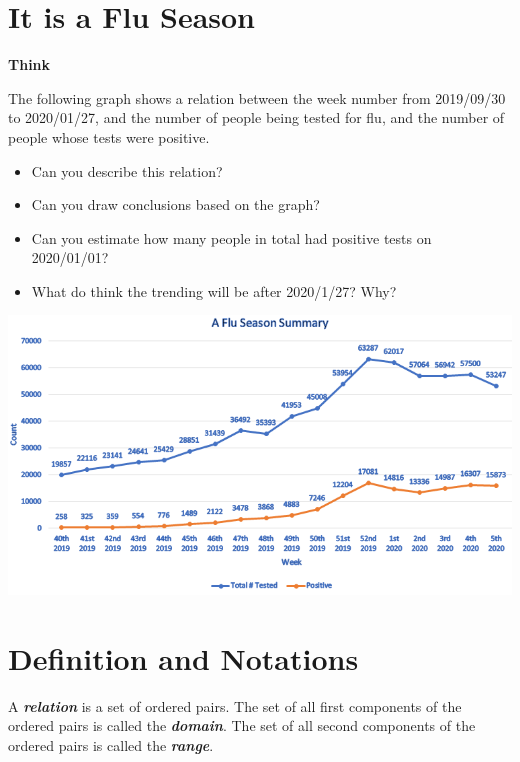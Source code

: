 \documentclass[en,12pt]{elegantbook}
\providecommand{\tightlist}{%
  \setlength{\itemsep}{0pt}\setlength{\parskip}{0pt}}
\newenvironment{rmdthink}{
	\par\noindent
	{
		\makebox[-\width][r]{
			\footnotesize
			\color{green!90}\faLightbulbO
			\hspace*{3pt}
		}
			\textbf{
				\color{second}
				Think 
			}
    }
    \begin{shaded}
    \sffamily
}{
    \par\medskip\ignorespacesafterend
    \end{shaded}
}
\providecommand{\tightlist}{%
  \setlength{\itemsep}{0pt}\setlength{\parskip}{0pt}}
\begin{document}
\hypertarget{it-is-a-flu-season}{%
\section{It is a Flu Season}\label{it-is-a-flu-season}}

\begin{rmdthink}

The following graph shows a relation between the week number from 2019/09/30 to 2020/01/27, and the number of people being tested for flu, and the number of people whose tests were positive.

\begin{itemize}
\tightlist
\item
  Can you describe this relation?
\item
  Can you draw conclusions based on the graph?
\item
  Can you estimate how many people in total had positive tests on 2020/01/01?
\item
  What do think the trending will be after 2020/1/27? Why?
\end{itemize}

\begin{center}\includegraphics[width=0.9\linewidth]{figs/flu-season} \end{center}

\end{rmdthink}

\hypertarget{definition-and-notations}{%
\section{Definition and Notations}\label{definition-and-notations}}

A \textbf{\emph{relation}} is a set of ordered pairs. The set of all first components of the ordered pairs is called the \textbf{\emph{domain}}. The set of all second components of the ordered pairs is called the \textbf{\emph{range}}.
\end{document}
